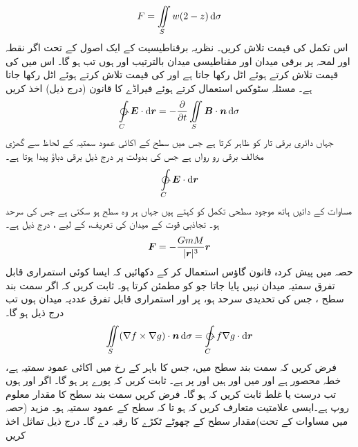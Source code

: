 \[F=\iint\limits_S w(2-z)\dif\sigma\]
اس تکمل کی قیمت تلاش کریں۔
\quad 
 نظریہ برقناطیسیت  کے  ایک اصول کے تحت   اگر نقطہ  اور لمحہ  پر برقی میدان اور مقناطیسی میدان بالترتیب   اور   ہوں تب  ہو گا۔ اس میں  کی قیمت تلاش کرتے ہوئے   اٹل رکھا جاتا ہے اور  کی قیمت تلاش کرتے ہوئے  اٹل رکھا جاتا ہے۔ مسئلہ سٹوکس استعمال کرتے ہوئے  فیراڈے کا قانون (درج ذیل)  اخذ کریں 
\[\ointctrclockwise\limits_C \kvec{E}\cdot\dif\kvec{r}=-\frac{\partial}{\partial t}\iint\limits_S\kvec{B}\cdot\an\dif\sigma\]
جہاں  دائری برقی تار کو ظاہر کرتا ہے جس میں سطح کے اکائی عمود سمتیہ  کے لحاظ سے گھڑی مخالف برقی رو رواں ہے جس کی بدولت   پر  درج ذیل برقی دباؤ پیدا ہوتا ہے۔
\[\ointctrclockwise\limits_C \kvec{E}\cdot\dif\kvec{r}\]
مساوات کے دائیں ہاتھ موجود  سطحی تکمل کو کہتے ہیں جہاں  ہر وہ سطح ہو سکتی ہے جس کی سرحد  ہو۔
تجاذبی قوت کے میدان    کی تعریف،   کے لیے ، درج ذیل ہے۔
\[{{\boldsymbol{F}}}=-\frac{GmM}{|{{\boldsymbol{r}}}|^3}{{\boldsymbol{r}}}\]
حصہ  میں پیش کردہ    قانون گاؤس استعمال کر کے  دکھائیں کہ ایسا کوئی استمراری قابل تفرق سمتیہ میدان  نہیں پایا جاتا جو  کو مطمئن کرتا ہو۔
ثابت کریں کہ  اگر سمت بند سطح ، جس کی تحدیدی سرحد  ہو،  پر   اور  استمراری قابل تفرق عددیہ میدان ہوں تب درج ذیل ہو گا۔
\[\iint\limits_S (\nabla f\times \nabla g)\cdot\an\dif\sigma=\ointctrclockwise\limits_C f\nabla g\cdot\dif \kvec{r}\]
فرض کریں  کہ   سمت بند سطح        میں، جس کا باہر  کے رخ  میں اکائی عمود سمتیہ  ہے، خطہ    محصور ہے اور   میں    اور  ہیں  اور  پر  ہے۔ ثابت کریں کہ  پورے  پر  ہو گا۔
اگر   اور  ہوں تب  درست یا غلط ثابت کریں کہ  ہو گا۔
فرض کریں سمت بند سطح کا  مقدار معلوم روپ   ہے۔ایسی علامتیت متعارف کریں کہ  ہو تا کہ   سطح کے عمود سمتیہ ہو۔ مزید (حصہ   میں مساوات   کے تحت)مقدار    سطح کے چھوٹے ٹکڑے کا رقبہ دے گا۔ درج ذیل تماثل اخذ کریں

